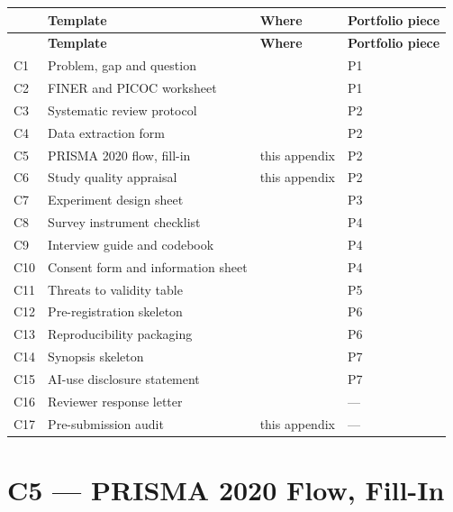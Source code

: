 \begin{center}
\small
\begin{longtable}{@{}L{1.0cm}L{5.6cm}L{3.0cm}L{4.4cm}@{}}
\toprule
 & \textbf{Template} & \textbf{Where} & \textbf{Portfolio piece} \\
\midrule
\endfirsthead
\toprule
 & \textbf{Template} & \textbf{Where} & \textbf{Portfolio piece} \\
\midrule
\endhead
\bottomrule
\endfoot
C1  & Problem, gap and question        &        & P1 \\
C2  & FINER and PICOC worksheet        &        & P1 \\
C3  & Systematic review protocol       &              & P2 \\
C4  & Data extraction form             &              & P2 \\
C5  & PRISMA 2020 flow, fill-in        & this appendix           & P2 \\
C6  & Study quality appraisal          & this appendix           & P2 \\
C7  & Experiment design sheet          &      & P3 \\
C8  & Survey instrument checklist      &           & P4 \\
C9  & Interview guide and codebook     &      & P4 \\
C10 & Consent form and information sheet &         & P4 \\
C11 & Threats to validity table        &         & P5 \\
C12 & Pre-registration skeleton        &           & P6 \\
C13 & Reproducibility packaging        &  & P6 \\
C14 & Synopsis skeleton                &         & P7 \\
C15 & AI-use disclosure statement      &            & P7 \\
C16 & Reviewer response letter         &       & --- \\
\midrule
C17 & Pre-submission audit             & this appendix           & --- \\
\end{longtable}
\end{center}

\section{C5 --- PRISMA 2020 Flow, Fill-In}

